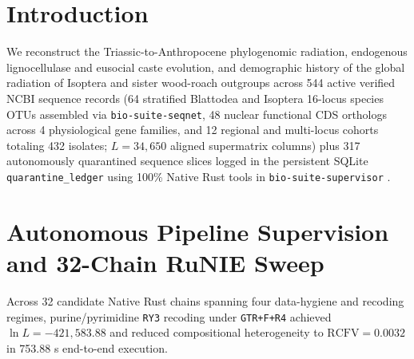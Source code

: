 \documentclass[10pt,letterpaper]{article}
\begin{document}
\section{Introduction}
We reconstruct the Triassic-to-Anthropocene phylogenomic radiation, endogenous lignocellulase and eusocial caste evolution, and demographic history of the global radiation of Isoptera and sister wood-roach outgroups across 544 active verified NCBI sequence records (64 stratified Blattodea and Isoptera 16-locus species OTUs assembled via \texttt{bio-suite-seqnet}, 48 nuclear functional CDS orthologs across 4 physiological gene families, and 12 regional and multi-locus cohorts totaling 432 isolates; $L = 34,650$ aligned supermatrix columns) plus 317 autonomously quarantined sequence slices logged in the persistent SQLite \texttt{quarantine\_ledger} using 100\% Native Rust tools in \texttt{bio-suite-supervisor} \cite{ref1,ref2,ref3}.
\section{Autonomous Pipeline Supervision and 32-Chain RuNIE Sweep}
Across 32 candidate Native Rust chains spanning four data-hygiene and recoding regimes, purine/pyrimidine \texttt{RY3} recoding under \texttt{GTR+F+R4} achieved $\ln L = -421,583.88$ and reduced compositional heterogeneity to $\mathrm{RCFV} = 0.0032$ in 753.88 s end-to-end execution.
\end{document}
